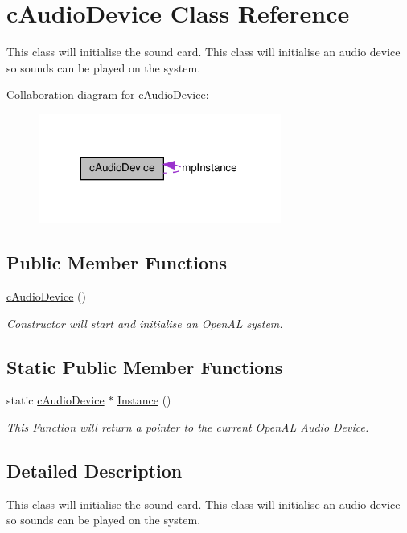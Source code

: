 \hypertarget{classc_audio_device}{
\section{cAudioDevice Class Reference}
\label{classc_audio_device}
}


This class will initialise the sound card. This class will initialise an audio device so sounds can be played on the system.  




Collaboration diagram for cAudioDevice:\nopagebreak
\begin{figure}[H]
\begin{center}
\leavevmode
\includegraphics[width=226pt]{classc_audio_device__coll__graph}
\end{center}
\end{figure}
\subsection*{Public Member Functions}
\begin{DoxyCompactItemize}
\item 
\hypertarget{classc_audio_device_a66ac901442496247a1e9a9ea7ef44120}{
\hyperlink{classc_audio_device_a66ac901442496247a1e9a9ea7ef44120}{cAudioDevice} ()}
\label{classc_audio_device_a66ac901442496247a1e9a9ea7ef44120}

\begin{DoxyCompactList}\small\item\em Constructor will start and initialise an OpenAL system. \end{DoxyCompactList}\end{DoxyCompactItemize}
\subsection*{Static Public Member Functions}
\begin{DoxyCompactItemize}
\item 
\hypertarget{classc_audio_device_aebae28f8c27622a408e616c50e096e85}{
static \hyperlink{classc_audio_device}{cAudioDevice} $\ast$ \hyperlink{classc_audio_device_aebae28f8c27622a408e616c50e096e85}{Instance} ()}
\label{classc_audio_device_aebae28f8c27622a408e616c50e096e85}

\begin{DoxyCompactList}\small\item\em This Function will return a pointer to the current OpenAL Audio Device. \end{DoxyCompactList}\end{DoxyCompactItemize}


\subsection{Detailed Description}
This class will initialise the sound card. This class will initialise an audio device so sounds can be played on the system. 